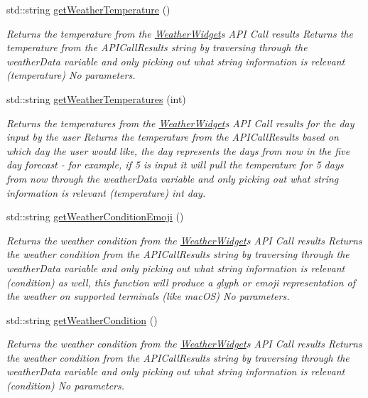 \begin{DoxyCompactItemize}
std\+::string \mbox{\hyperlink{class_weather_widget_a2ce2729ca424ece9ad9eff074d76f5a1}{get\+Weather\+Temperature}} ()
\begin{DoxyCompactList}\small\item\em Returns the temperature from the \mbox{\hyperlink{class_weather_widget}{Weather\+Widget}}\textquotesingle{}s A\+PI Call results  Returns the temperature from the A\+P\+I\+Call\+Results string by traversing through the weather\+Data variable and only picking out what string information is relevant (temperature)  No parameters. \end{DoxyCompactList}\item 
std\+::string \mbox{\hyperlink{class_weather_widget_ae1ed8db845a67b1471ea78748a75c748}{get\+Weather\+Temperatures}} (int)
\begin{DoxyCompactList}\small\item\em Returns the temperatures from the \mbox{\hyperlink{class_weather_widget}{Weather\+Widget}}\textquotesingle{}s A\+PI Call results for the day input by the user  Returns the temperature from the A\+P\+I\+Call\+Results based on which day the user would like, the day represents the days from now in the five day forecast -\/ for example, if 5 is input it will pull the temperature for 5 days from now through the weather\+Data variable and only picking out what string information is relevant (temperature)  int day. \end{DoxyCompactList}\item 
std\+::string \mbox{\hyperlink{class_weather_widget_aacd35e452cf154b858144de80862334f}{get\+Weather\+Condition\+Emoji}} ()
\begin{DoxyCompactList}\small\item\em Returns the weather condition from the \mbox{\hyperlink{class_weather_widget}{Weather\+Widget}}\textquotesingle{}s A\+PI Call results  Returns the weather condition from the A\+P\+I\+Call\+Results string by traversing through the weather\+Data variable and only picking out what string information is relevant (condition) as well, this function will produce a glyph or emoji representation of the weather on supported terminals (like mac\+OS)  No parameters. \end{DoxyCompactList}\item 
std\+::string \mbox{\hyperlink{class_weather_widget_ac46edf497f42b64982707a3886b28b4d}{get\+Weather\+Condition}} ()
\begin{DoxyCompactList}\small\item\em Returns the weather condition from the \mbox{\hyperlink{class_weather_widget}{Weather\+Widget}}\textquotesingle{}s A\+PI Call results  Returns the weather condition from the A\+P\+I\+Call\+Results string by traversing through the weather\+Data variable and only picking out what string information is relevant (condition)  No parameters. \end{DoxyCompactList}\item 

\end{DoxyCompactItemize}
